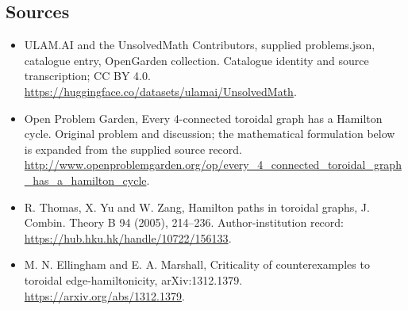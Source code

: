 \documentclass[11pt,a4paper]{article}
\begin{document}
\subsection{Sources}
\begin{itemize}
\item[S1] ULAM.AI and the UnsolvedMath Contributors, supplied problems.json, catalogue entry, OpenGarden collection. Catalogue identity and source transcription; CC BY 4.0.
\url{https://huggingface.co/datasets/ulamai/UnsolvedMath}.
\item[S2] Open Problem Garden, Every 4-connected toroidal graph has a Hamilton cycle. Original problem and discussion; the mathematical formulation below is expanded from the supplied source record.
\url{http://www.openproblemgarden.org/op/every_4_connected_toroidal_graph_has_a_hamilton_cycle}.

\item[R1] R. Thomas, X. Yu and W. Zang, Hamilton paths in toroidal graphs,
J. Combin. Theory B 94 (2005), 214--236. Author-institution record:
\url{https://hub.hku.hk/handle/10722/156133}.
\item[R2] M. N. Ellingham and E. A. Marshall, Criticality of counterexamples
to toroidal edge-hamiltonicity, arXiv:1312.1379.
\url{https://arxiv.org/abs/1312.1379}.

\end{itemize}
\end{document}
